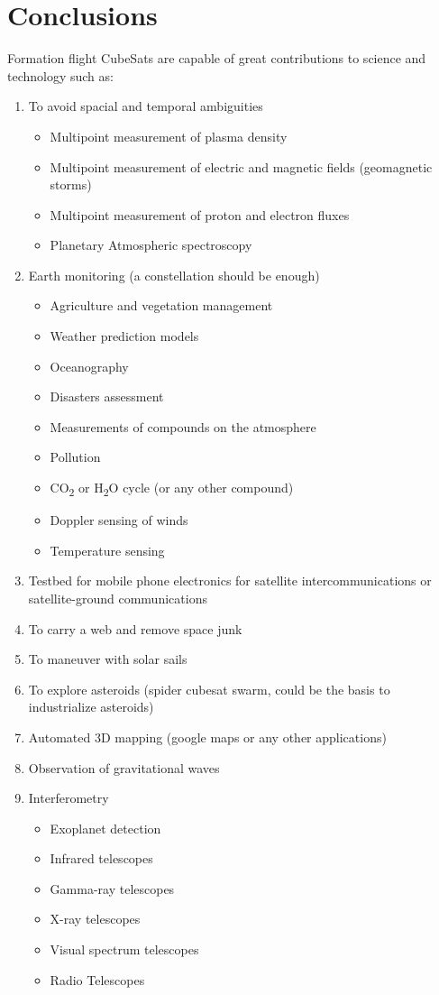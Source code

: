 \section{Conclusions}
Formation flight CubeSats are capable of great contributions to science
and technology such as:
\begin{enumerate}
\item To avoid spacial and temporal ambiguities

\begin{itemize}
\item Multipoint measurement of plasma density
\item Multipoint measurement of electric and magnetic fields (geomagnetic storms)
\item Multipoint measurement of proton and electron fluxes
\item Planetary Atmospheric spectroscopy
\end{itemize}
\item Earth monitoring (a constellation should be enough)

\begin{itemize}
\item Agriculture and vegetation management
\item Weather prediction models
\item Oceanography
\item Disasters assessment
\item Measurements of compounds on the atmosphere
\item Pollution
\item CO\textsubscript{2} or H\textsubscript{2}O cycle (or any other compound)
\item Doppler sensing of winds
\item Temperature sensing
\end{itemize}
\item Testbed for mobile phone electronics for satellite intercommunications
or satellite-ground communications
\item To carry a web and remove space junk
\item To maneuver with solar sails
\item To explore asteroids (spider cubesat swarm, could be the basis to
industrialize asteroids)
\item Automated 3D mapping (google maps or any other applications)
\item Observation of gravitational waves
\item Interferometry

\begin{itemize}
\item Exoplanet detection
\item Infrared telescopes
\item Gamma-ray telescopes
\item X-ray telescopes
\item Visual spectrum telescopes
\item Radio Telescopes
\end{itemize}
\end{enumerate}